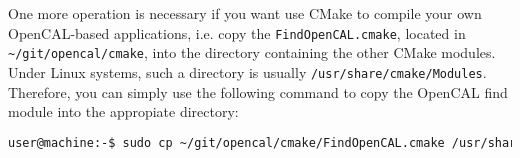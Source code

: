 

One more operation is necessary if you want use CMake to compile your
own OpenCAL-based applications, i.e. copy the
\verb'FindOpenCAL.cmake', located in \verb'~/git/opencal/cmake', into
the directory containing the other CMake modules. Under Linux systems,
such a directory is usually
\verb'/usr/share/cmake/Modules'. Therefore, you can simply use the
following command to copy the OpenCAL find module into the appropiate
directory:

\begin{lstlisting}[numbers=none,language=bash]
  user@machine:-$ sudo cp ~/git/opencal/cmake/FindOpenCAL.cmake /usr/share/cmake/Modules
\end{lstlisting}

